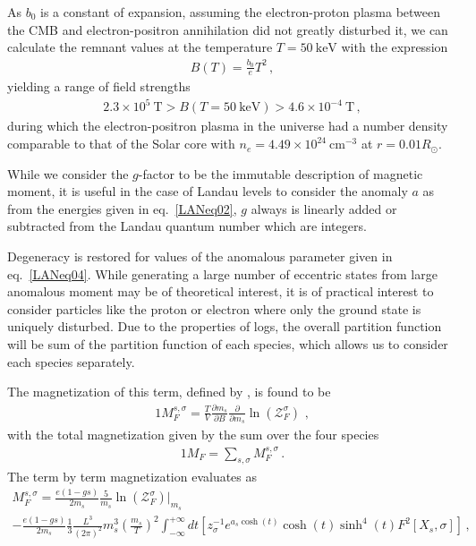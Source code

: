 As $b_0$ is a constant of expansion, assuming the electron-proton plasma between the CMB and electron-positron annihilation did not greatly disturbed it, we can calculate the remnant values at the temperature $T=50\ \mathrm{keV}$ with the expression
\begin{align}
  \label{BBNFields} B(T)=\frac{b_{0}}{e}T^{2}\,,
\end{align}
yielding a range of field strengths
\begin{align}
  \label{BBNRange} 2.3\times10^{5}\ \mathrm{T}>B(T=50\ \mathrm{keV})>4.6\times10^{-4}\ \mathrm{T}\,,
\end{align}
during which the electron-positron plasma in the universe had a number density comparable to that of the Solar core with $n_{e}=4.49\times10^{24}\ \mathrm{cm}^{-3}$ at $r=0.01R_{\odot}$.

While we consider the $g$-factor to be the immutable description of magnetic moment, it is useful in the case of Landau levels to consider the anomaly $a$ as from the energies given in eq.~\eqref{LANeq02}, $g$ always is linearly added or subtracted from the Landau quantum number which are integers.

Degeneracy is restored for values of the anomalous parameter given in eq.~\eqref{LANeq04}. While generating a large number of eccentric states from large anomalous moment may be of theoretical interest, it is of practical interest to consider particles like the proton or electron where only the ground state is uniquely disturbed. Due to the properties of logs, the overall partition function will be sum of the partition function of each species, which allows us to consider each species separately.

The magnetization of this term, defined by , is found to be
\begin{alignat}{1}
    \label{FreelikeMag} M_{F}^{s,\sigma}=\frac{T}{V}\frac{\partial m_{s}}{\partial B}\frac{\partial}{\partial m_{s}}\ln(\mathcal{Z}_{F}^{\sigma})\,\,,
\end{alignat}
with the total magnetization given by the sum over the four species
\begin{alignat}{1}
    \label{TotalFreeMag} M_{F}=\sum_{s,\sigma}M_{F}^{s,\sigma}\,.
\end{alignat}
The term by term magnetization evaluates as
\begin{multline}
  \label{MagExplicit} M_{F}^{s,\sigma} = \frac{e(1-gs)}{2m_{s}}\frac{5}{m_{s}}\ln\left(\mathcal{Z}^{\sigma}_{F}\right)|_{m_{s}}\\
  -\frac{e(1-gs)}{2m_{s}}\frac{1}{3}\frac{L^{3}}{(2\pi)^{2}}m_{s}^{3}\left(\frac{m_{s}}{T}\right)^{2}
  \int_{-\infty}^{+\infty}dt\left[z_{\sigma}^{-1}e^{a_{s}\cosh(t)}\cosh(t)\sinh^{4}(t)F^{2}\left[X_{s},\sigma\right]\right]\,,
\end{multline}